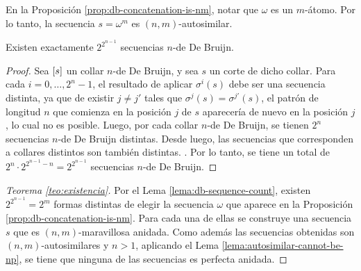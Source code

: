 \documentclass[11pt]{article}
\begin{document}


\begin{remark}
	En la Proposición \ref{prop:db-concatenation-is-nm}, notar que $\omega$ es un
	$m$-átomo. Por lo tanto, la secuencia $s = \omega^m$ es $(n,m)$-autosimilar.
\end{remark}

\begin{lema}
	\label{lema:db-sequence-count}
	Existen exactamente $2^{2^{n-1}}$ secuencias $n$-de De Bruijn.
\end{lema}

\begin{proof}
	Sea $\left[s\right]$ un collar $n$-de De Bruijn, y sea $s$ un corte de dicho
	collar. Para cada $i = 0,\dots,2^n-1$, el resultado de aplicar $\sigma^i(s)$
	debe ser una secuencia distinta, ya que de existir $j \neq j'$ tales que
	$\sigma^j(s) = \sigma^{j'}(s)$, el patrón de longitud $n$ que comienza en la
	posición $j$ de $s$ aparecería de nuevo en la posición $j$, lo cual no es
	posible. Luego, por cada collar $n$-de De Bruijn, se tienen $2^n$ secuencias
	$n$-de De Bruijn distintas. Desde luego, las secuencias que corresponden a
	collares distintos son también distintas.
	.
	Por lo tanto, se tiene un total de
	$2^n \cdot 2^{2^{n-1}-n} = 2^{2^{n-1}}$ secuencias $n$-de De Bruijn.
\end{proof}




\begin{proof}[Teorema \ref{teo:existencia}]
	Por el Lema \ref{lema:db-sequence-count}, existen $2^{2^{n-1}} = 2^m$ formas
	distintas de elegir la secuencia $\omega$ que aparece en la Proposición
	\ref{prop:db-concatenation-is-nm}. Para cada una de ellas se construye una
	secuencia $s$ que es $(n, m)$-maravillosa anidada. Como además las
	secuencias obtenidas son $(n,m)$-autosimilares y $n > 1$, aplicando el Lema
	\ref{lema:autosimilar-cannot-be-np}, se tiene que ninguna de las secuencias
	es perfecta anidada.
\end{proof}
\end{document}
